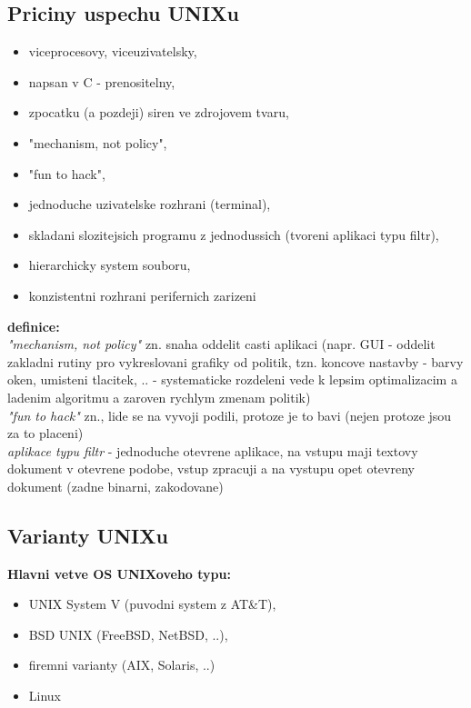 \documentclass[a4paper, 11pt]{article}
\begin{document}
\subsection{Priciny uspechu UNIXu}
\begin{itemize}
    \item viceprocesovy, viceuzivatelsky,
    \item napsan v C - prenositelny,
    \item zpocatku (a pozdeji) siren ve zdrojovem tvaru,
    \item "mechanism, not policy",
    \item "fun to hack",
    \item jednoduche uzivatelske rozhrani (terminal),
    \item skladani slozitejsich programu z jednodussich (tvoreni aplikaci typu filtr),
    \item hierarchicky system souboru,
    \item konzistentni rozhrani perifernich zarizeni \\
\end{itemize}

\noindent\textbf{definice:} \\[0.5em]
\textit{"mechanism, not policy"} zn. snaha oddelit casti aplikaci (napr. GUI - oddelit zakladni rutiny pro vykreslovani grafiky od politik, tzn. koncove nastavby - barvy oken, umisteni tlacitek, .. - systematicke rozdeleni vede k lepsim optimalizacim a ladenim algoritmu a zaroven rychlym zmenam politik) \\[0.2em]
\textit{"fun to hack"} zn., lide se na vyvoji podili, protoze je to bavi (nejen protoze jsou za to placeni) \\[0.2em]
\textit{aplikace typu filtr} - jednoduche otevrene aplikace, na vstupu maji textovy dokument v otevrene podobe, vstup zpracuji a na vystupu opet otevreny dokument (zadne binarni, zakodovane) \\[1em]

\newpage

\subsection{Varianty UNIXu}
\textbf{Hlavni vetve OS UNIXoveho typu:}
\begin{itemize}
    \item UNIX System V (puvodni system z AT\&T),
    \item BSD UNIX (FreeBSD, NetBSD, ..),
    \item firemni varianty (AIX, Solaris, ..)
    \item Linux \\
\end{itemize}
\end{document}

